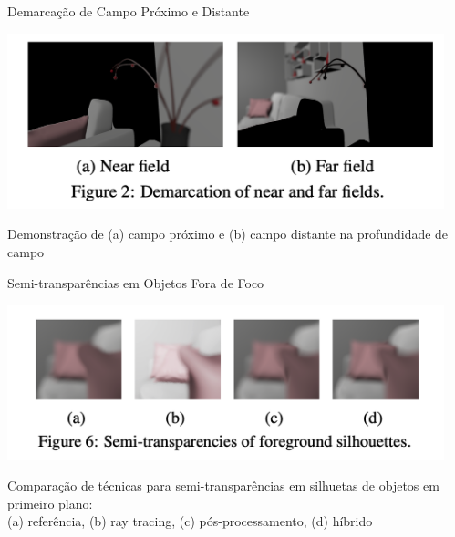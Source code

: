 \documentclass[aspectratio=169,xcolor=table]{beamer}
\begin{document}
\begin{frame}{Demarcação de Campo Próximo e Distante}
    \begin{center}
        \includegraphics[width=0.95\textwidth]{near-far-field}
    \end{center}
    \begin{center}
        \small{Demonstração de (a) campo próximo e (b) campo distante na profundidade de campo}
    \end{center}
\end{frame}

\begin{frame}{Semi-transparências em Objetos Fora de Foco}
    \begin{center}
        \includegraphics[width=0.95\textwidth]{semi-transparencias}
    \end{center}
    \begin{center}
        \small{Comparação de técnicas para semi-transparências em silhuetas de objetos em primeiro plano:\\
        (a) referência, (b) ray tracing, (c) pós-processamento, (d) híbrido}
    \end{center}
\end{frame}
\end{document}
